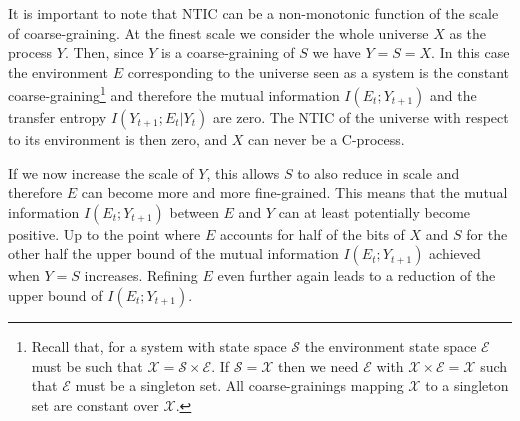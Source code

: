 \documentclass[utf8]{article}
\newcommand{\X}{\mathcal{X}}
\renewcommand{\S}{\mathcal{S}}
\newcommand{\E}{\mathcal{E}}
\begin{document}
    		It is important to note that NTIC can be a non-monotonic function of the scale of coarse-graining. At the finest scale we consider the whole universe $X$ as the process $Y$. Then, since $Y$ is a coarse-graining of $S$ we have $Y=S=X$. In this case the environment $E$ corresponding to the universe seen as a system is the constant coarse-graining\footnote{Recall that, for a system with state space $\S$ the environment state space $\E$ must be such that $\X=\S \times \E$. If $\S =\X$ then we need $\E$ with $\X \times \E=\X$ such that $\E$ must be a singleton set. All coarse-grainings mapping $\X$ to a singleton set are constant over $\X$.} and therefore the mutual information $I(E_t;Y_{t+1})$ and the transfer entropy $I(Y_{t+1};E_t|Y_t)$ are zero. The NTIC of the universe with respect to its environment is then zero, and $X$ can never be a C-process.
    		
    		If we now increase the scale of $Y$, this allows $S$ to also reduce in scale and therefore $E$ can become more and more fine-grained. This means that the mutual information $I(E_t;Y_{t+1})$ between $E$ and $Y$ can at least potentially become positive. Up to the point where $E$ accounts for half of the bits of $X$ and $S$ for the other half the upper bound of the mutual information $I(E_t;Y_{t+1})$ achieved when $Y=S$ increases. Refining $E$ even further again leads to a reduction of the upper bound of $I(E_t;Y_{t+1})$.
    		
\end{document}
